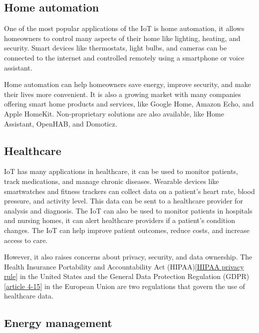 \subsection{Home automation}
\label{subsec:iot-home-automation}

One of the most popular applications of the IoT is home automation, it allows homeowners to control many aspects of their
home like lighting, heating, and security. Smart devices like thermostats, light bulbs, and cameras can be connected to
the internet and controlled remotely using a smartphone or voice assistant.

Home automation can help homeowners save energy, improve security, and make their lives more convenient. It is also a
growing market with many companies offering smart home products and services, like Google Home, Amazon Echo, and Apple
HomeKit. Non-proprietary solutions are also available, like Home Assistant, OpenHAB, and Domoticz.

\subsection{Healthcare}
\label{subsec:iot-healthcare}

IoT has many applications in healthcare, it can be used to monitor patients, track medications, and manage chronic diseases.
Wearable devices like smartwatches and fitness trackers can collect data on a patient's heart rate, blood pressure, and
activity level. This data can be sent to a healthcare provider for analysis and diagnosis. The IoT can also be used to monitor
patients in hospitals and nursing homes, it can alert healthcare providers if a patient's condition changes. The IoT can help
improve patient outcomes, reduce costs, and increase access to care.

However, it also raises concerns about privacy, security, and data ownership. The Health Insurance Portability and Accountability
Act (HIPAA)[\href{https://www.hhs.gov/hipaa/for-professionals/privacy/index.html}{HIPAA privacy rule}] in the United States
and the General Data Protection Regulation
(GDPR)[\href{https://www.cnil.fr/fr/reglement-europeen-protection-donnees/chapitre1#Article4}{article 4-15}] in the European
Union are two regulations that govern the use of healthcare data.

\subsection{Energy management}
\label{subsec:iot-energy-management}

